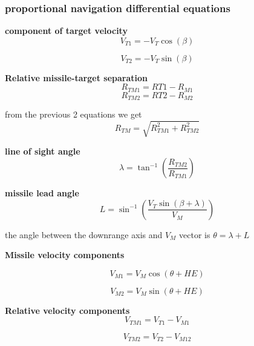 \subsubsection*{proportional navigation differential equations}

\textbf{component of target velocity} 
\begin{equation}
	V_{T1} = - V_T \cos(\beta)
\end{equation}

\begin{equation}
V_{T2} = - V_T \sin(\beta)
\end{equation}

\textbf{Relative missile-target separation}
\begin{equation}
	R_{TM1} = R{T1} - R_{M1}
\end{equation}
\begin{equation}
R_{TM2} = R{T2} - R_{M2}
\end{equation}

from the previous 2 equations we get
\begin{equation}
	R_{TM} = \sqrt{R_{TM1}^2 + R_{TM2}^2}
	\label{RTM}
\end{equation}

\textbf{line of sight angle}
\begin{equation}
	\lambda = \tan^{-1} (\dfrac{R_{TM2}}{R_{TM1}})
	\label{lambda}
\end{equation}

\textbf{missile lead angle} 
\begin{equation}
	L= \sin^{-1}(\dfrac{V_T \sin(\beta + \lambda)}{V_M})
\end{equation}

the angle between the downrange axis and $V_M$ vector is $\theta = \lambda + L$

\textbf{Missile velocity components} 

\begin{equation}
	V_{M1} = V_M \cos (\theta + HE)
\end{equation}

\begin{equation}
V_{M2} = V_M \sin (\theta + HE)
\end{equation}

\textbf{Relative velocity components}
\begin{equation}
	V_{TM1} = V_{T1} - V_{M1}
\end{equation}

\begin{equation}
V_{TM2} = V_{T2} - V_{M12}
\end{equation}


